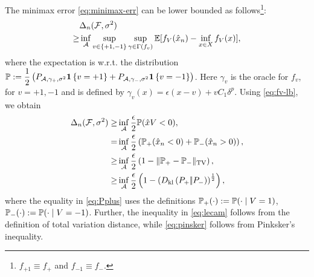 
The minimax error \eqref{eq:minimax-err} can be lower bounded as follows\footnote{$f_{+1} \equiv f_+$ and $f_{-1}\equiv f_-$.}:
\begin{align}
 &\Delta_n(\F, \sigma^2)\nonumber\\
  \ge & \inf_{\A} \sup_{v \in \{+1,-1\}} \sup_{\gamma \in \Gamma(f_v)} \E[f_V(\hat x_n) - \inf_{x \in X}
  f_V(x)],\label{eq:avg-bd}
  \end{align}
where the expectation is w.r.t. the distribution $\P:= \dfrac{1}{2} \left(P_{\A, \gamma_+, \sigma^2} \indic{v=+1} + P_{\A, \gamma_-, \sigma^2}\indic{v=-1}\right)$. Here $\gamma_v$  is the oracle for $f_v$, for $v=+1,-1$ and is defined by $\gamma_v(x) = \epsilon(x-v) + v C_1 \delta^p$. 
Using \eqref{eq:fv-lb}, we obtain
\begin{align}
\Delta_n(\F, \sigma^2)  \ge & \inf_{\A} \dfrac{\epsilon}{2}  \P(\hat x V < 0), \label{eq:strong-convex-bd}\\
  = & \inf_{\A} \dfrac{\epsilon }{2}  \left(\P_{+}(\hat x_n < 0) + \P_{-}(\hat x_n > 0)\right), \label{eq:Pplus}\\
  \ge &\inf_{\A} \dfrac{\epsilon }{2} \left(1 - \tvnorm{\P_{+}- \P_{-}}\right), \label{eq:lecam}\\
  \ge &\inf_{\A} \dfrac{\epsilon }{2}  \left( 1 - \left(\dkl{P_{+}}{P_{-}}\right)^{\frac{1}{2}}\right), \label{eq:pinsker}
\end{align}
where 
the equality in \eqref{eq:Pplus} uses the definitions $\P_{+}(\cdot) := \P(\cdot\mid V=1)$, $\P_{-}(\cdot) := \P(\cdot\mid V=-1)$. Further, the inequality in \eqref{eq:lecam} follows from the definition of total variation distance, while \eqref{eq:pinsker} follows from Pinksker's inequality.







